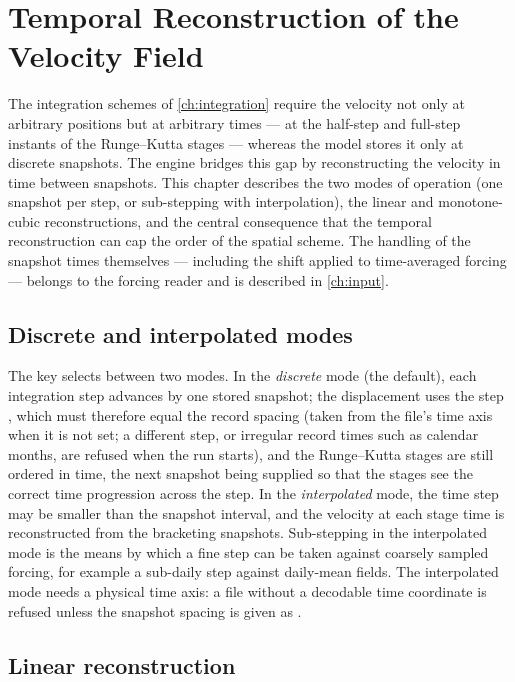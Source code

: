 \chapter{Temporal Reconstruction of the Velocity Field}\label{ch:temporal}

The integration schemes of \cref{ch:integration} require the velocity not only at
arbitrary positions but at arbitrary times --- at the half-step and full-step instants
of the Runge--Kutta stages --- whereas the model stores it only at discrete snapshots.
The engine bridges this gap by reconstructing the velocity in time between snapshots.
This chapter describes the two modes of operation (one snapshot per step, or
sub-stepping with interpolation), the linear and monotone-cubic reconstructions, and the
central consequence that the temporal reconstruction can cap the order of the spatial
scheme. The handling of the snapshot times themselves --- including the shift applied to
time-averaged forcing --- belongs to the forcing reader and is described in
\cref{ch:input}.

\section{Discrete and interpolated modes}\label{sec:temp-modes}

The key  selects between two modes. In the \emph{discrete} mode (the default),
each integration step advances by one stored snapshot; the displacement uses the step ,
which must therefore equal the record spacing (taken from the file's time axis when it is not set; a
different step, or irregular record times such as calendar months, are refused when the run starts), and
the Runge--Kutta stages are
still ordered in time, the next snapshot being supplied so that the stages see the correct time
progression across the step. In the \emph{interpolated} mode, the time step may be smaller than the
snapshot interval, and the velocity at each stage time is reconstructed from the bracketing snapshots.
Sub-stepping in the interpolated mode is the means by which a fine step can be taken against coarsely
sampled forcing, for example a sub-daily step against daily-mean fields. The interpolated mode needs a
physical time axis: a file without a decodable time coordinate is refused unless the snapshot spacing
is given as .

\section{Linear reconstruction}\label{sec:temp-linear}

